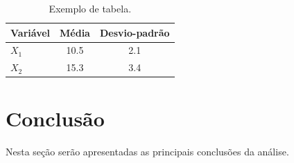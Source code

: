 \documentclass[12pt,a4paper]{article}
\begin{document}
\begin{table}[H]
    \centering
    \caption{Exemplo de tabela.}
    \begin{tabular}{lcc}
        \toprule
        Variável & Média & Desvio-padrão \\
        \midrule
        $X_1$ & 10.5 & 2.1 \\
        $X_2$ & 15.3 & 3.4 \\
        \bottomrule
    \end{tabular}
    \label{tab:exemplo}
\end{table}

\section{Conclusão}

Nesta seção serão apresentadas as principais conclusões da análise.


%
% 
% 
\end{document}

